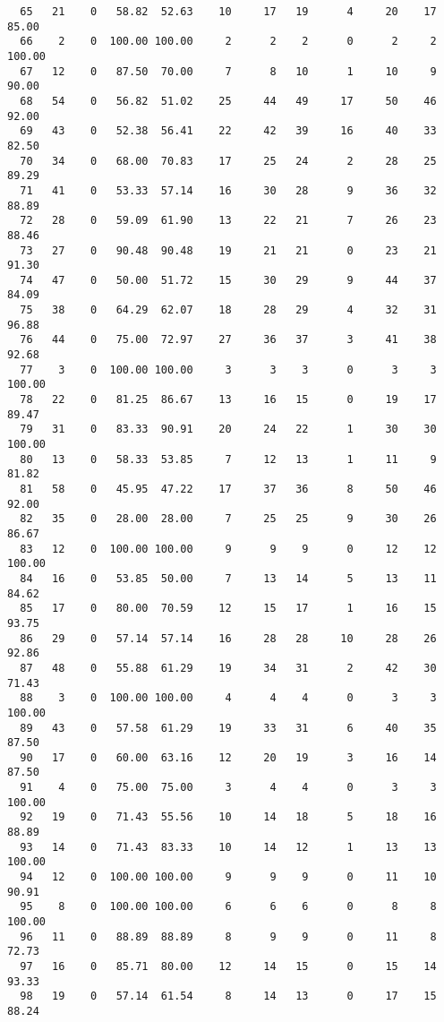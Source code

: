 \begin{verbatim}
  65   21    0   58.82  52.63    10     17   19      4     20    17    85.00
  66    2    0  100.00 100.00     2      2    2      0      2     2   100.00
  67   12    0   87.50  70.00     7      8   10      1     10     9    90.00
  68   54    0   56.82  51.02    25     44   49     17     50    46    92.00
  69   43    0   52.38  56.41    22     42   39     16     40    33    82.50
  70   34    0   68.00  70.83    17     25   24      2     28    25    89.29
  71   41    0   53.33  57.14    16     30   28      9     36    32    88.89
  72   28    0   59.09  61.90    13     22   21      7     26    23    88.46
  73   27    0   90.48  90.48    19     21   21      0     23    21    91.30
  74   47    0   50.00  51.72    15     30   29      9     44    37    84.09
  75   38    0   64.29  62.07    18     28   29      4     32    31    96.88
  76   44    0   75.00  72.97    27     36   37      3     41    38    92.68
  77    3    0  100.00 100.00     3      3    3      0      3     3   100.00
  78   22    0   81.25  86.67    13     16   15      0     19    17    89.47
  79   31    0   83.33  90.91    20     24   22      1     30    30   100.00
  80   13    0   58.33  53.85     7     12   13      1     11     9    81.82
  81   58    0   45.95  47.22    17     37   36      8     50    46    92.00
  82   35    0   28.00  28.00     7     25   25      9     30    26    86.67
  83   12    0  100.00 100.00     9      9    9      0     12    12   100.00
  84   16    0   53.85  50.00     7     13   14      5     13    11    84.62
  85   17    0   80.00  70.59    12     15   17      1     16    15    93.75
  86   29    0   57.14  57.14    16     28   28     10     28    26    92.86
  87   48    0   55.88  61.29    19     34   31      2     42    30    71.43
  88    3    0  100.00 100.00     4      4    4      0      3     3   100.00
  89   43    0   57.58  61.29    19     33   31      6     40    35    87.50
  90   17    0   60.00  63.16    12     20   19      3     16    14    87.50
  91    4    0   75.00  75.00     3      4    4      0      3     3   100.00
  92   19    0   71.43  55.56    10     14   18      5     18    16    88.89
  93   14    0   71.43  83.33    10     14   12      1     13    13   100.00
  94   12    0  100.00 100.00     9      9    9      0     11    10    90.91
  95    8    0  100.00 100.00     6      6    6      0      8     8   100.00
  96   11    0   88.89  88.89     8      9    9      0     11     8    72.73
  97   16    0   85.71  80.00    12     14   15      0     15    14    93.33
  98   19    0   57.14  61.54     8     14   13      0     17    15    88.24

\end{verbatim}

